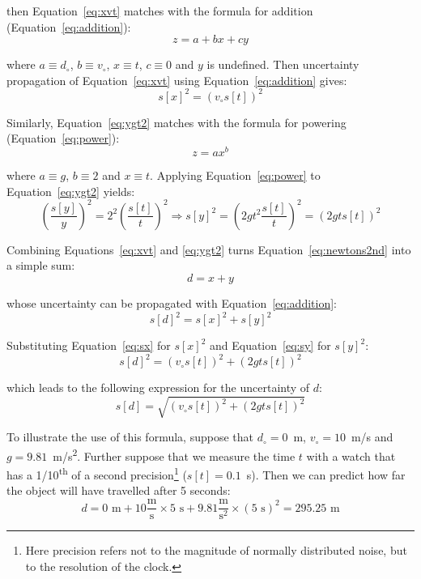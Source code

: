 \begin{enumerate}
  \noindent then Equation~\ref{eq:xvt} matches with the formula for
  addition (Equation~\ref{eq:addition}):
  \[
  z = a + bx + cy
  \]

  \noindent where $a \equiv d_\circ$, $b \equiv v_\circ$, $x \equiv t$,
  $c \equiv 0$ and $y$ is undefined. Then uncertainty propagation of
  Equation~\ref{eq:xvt} using Equation~\ref{eq:addition} gives:
  \begin{equation}
    s[x]^2 = \left(v_\circ s[t]\right)^2
    \label{eq:sx}
  \end{equation}

  Similarly, Equation~\ref{eq:ygt2} matches with the formula for
  powering (Equation~\ref{eq:power}):
  \[
  z = a x^b
  \]

  \noindent where $a \equiv g$, $b \equiv 2$ and $x \equiv t$. Applying
  Equation~\ref{eq:power} to Equation~\ref{eq:ygt2} yields:
  \begin{equation}
    \left(\frac{s[y]}{y}\right)^2 =  2^2 \left(\frac{s[t]}{t}\right)^2
    \Rightarrow s[y]^2 = \left(2 g t^2 \frac{s[t]}{t}\right)^2 =
    \left(2 g t s[t]\right)^2
    \label{eq:sy}
  \end{equation}

  Combining Equations~\ref{eq:xvt} and \ref{eq:ygt2} turns
  Equation~\ref{eq:newtons2nd} into a simple sum:
  \[
  d = x + y
  \]

  \noindent whose uncertainty can be propagated with
  Equation~\ref{eq:addition}:
  \[
  s[d]^2 = s[x]^2 + s[y]^2
  \]

  Substituting Equation~\ref{eq:sx} for $s[x]^2$ and
  Equation~\ref{eq:sy} for $s[y]^2$:
  \[
  s[d]^2 = \left(v_\circ s[t]\right)^2 + \left(2 g t s[t]\right)^2
  \]

  \noindent which leads to the following expression for the
  uncertainty of $d$:
  \begin{equation}
    s[d] = \sqrt{\left(v_\circ s[t]\right)^2 + \left(2 g t s[t]\right)^2}
    \label{eq:sdnewton}
  \end{equation}

  To illustrate the use of this formula, suppose that $d_\circ=0$~m,
  $v_\circ=10$~m/s and $g=9.81$~m/s\textsuperscript{2}.  Further
  suppose that we measure the time $t$ with a watch that has a
  1/10\textsuperscript{th} of a second precision\footnote{Here
    precision refers not to the magnitude of normally distributed
    noise, but to the resolution of the clock.} ($s[t]=0.1$~s). Then
  we can predict how far the object will have travelled after 5
  seconds:
  \begin{equation}
  d = 0 \mbox{~m} +
  10 \frac{\mbox{m}}{\mbox{s}} \times 5 \mbox{~s} +
  9.81\frac{\mbox{m}}{\mbox{s}^2} \times (5 \mbox{~s})^2 = 295.25\mbox{~m}
  \label{eq:snowy}
  \end{equation}


\end{enumerate}
